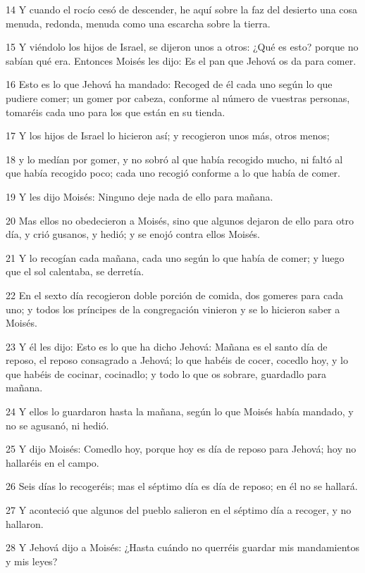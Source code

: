 \par 14 Y cuando el rocío cesó de descender, he aquí sobre la faz del desierto una cosa menuda, redonda, menuda como una escarcha sobre la tierra.
\par 15 Y viéndolo los hijos de Israel, se dijeron unos a otros: ¿Qué es esto? porque no sabían qué era. Entonces Moisés les dijo: Es el pan que Jehová os da para comer.
\par 16 Esto es lo que Jehová ha mandado: Recoged de él cada uno según lo que pudiere comer; un gomer por cabeza, conforme al número de vuestras personas, tomaréis cada uno para los que están en su tienda.
\par 17 Y los hijos de Israel lo hicieron así; y recogieron unos más, otros menos;
\par 18 y lo medían por gomer, y no sobró al que había recogido mucho, ni faltó al que había recogido poco; cada uno recogió conforme a lo que había de comer.
\par 19 Y les dijo Moisés: Ninguno deje nada de ello para mañana.
\par 20 Mas ellos no obedecieron a Moisés, sino que algunos dejaron de ello para otro día, y crió gusanos, y hedió; y se enojó contra ellos Moisés.
\par 21 Y lo recogían cada mañana, cada uno según lo que había de comer; y luego que el sol calentaba, se derretía.
\par 22 En el sexto día recogieron doble porción de comida, dos gomeres para cada uno; y todos los príncipes de la congregación vinieron y se lo hicieron saber a Moisés.
\par 23 Y él les dijo: Esto es lo que ha dicho Jehová: Mañana es el santo día de reposo, el reposo consagrado a Jehová; lo que habéis de cocer, cocedlo hoy, y lo que habéis de cocinar, cocinadlo; y todo lo que os sobrare, guardadlo para mañana.
\par 24 Y ellos lo guardaron hasta la mañana, según lo que Moisés había mandado, y no se agusanó, ni hedió.
\par 25 Y dijo Moisés: Comedlo hoy, porque hoy es día de reposo para Jehová; hoy no hallaréis en el campo.
\par 26 Seis días lo recogeréis; mas el séptimo día es día de reposo; en él no se hallará.
\par 27 Y aconteció que algunos del pueblo salieron en el séptimo día a recoger, y no hallaron.
\par 28 Y Jehová dijo a Moisés: ¿Hasta cuándo no querréis guardar mis mandamientos y mis leyes?
